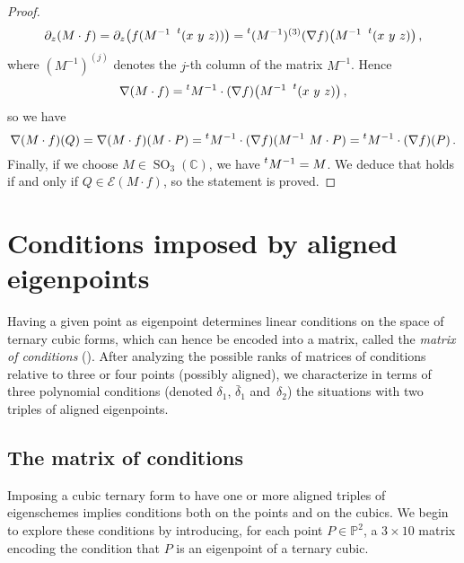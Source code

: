 \documentclass[a4paper, 11pt, reqno]{amsart}
\theoremstyle{plain}
\theoremstyle{definition}
\newcommand{\C}{\mathbb{C}}
\newcommand{\p}{\mathbb{P}}
\newcommand{\SO}{\operatorname{SO}}
\newcommand{\Eig}[1]{\mathcal{E}\!\left( {#1} \right)}
\begin{document}
\begin{proof}
\begin{gather*}
  \partial_z (M\cdot f) = \partial_z \bigl( f(M^{-1} \ \prescript{t} {} (x \ y \ z)) \bigr) = \prescript{t} {}(M^{-1})^{(3)}(\nabla f) \bigl( M^{-1}\ \prescript{t} {} (x \ y \ z) \bigr) \,,
\end{gather*}
%
where $(M^{-1})^{(j)}$ denotes the $j$-th column of the matrix $M^{-1}$. Hence
%
\[
  \nabla (M \cdot f) = \prescript{t} {} M^{-1} \cdot (\nabla f) \bigl(M^{-1}\ \prescript{t} {} (x \ y \ z)\bigr) \,,
\]
%
so we have
%
\[
  \nabla (M \cdot f)(Q)=\nabla (M \cdot f)(M \cdot P)=
  \prescript{t} {} M^{-1} \cdot (\nabla f) (M^{-1}\ M \cdot P)=\prescript{t} {} M^{-1} \cdot (\nabla f)(P) \,.
\]
%
Finally, if we choose $M \in \SO_3(\C)$, we have
$\prescript{t} {} M^{-1}=M$. We deduce that
 holds if and only if $Q \in \Eig{M\cdot f}$, so the statement is proved.
\end{proof}


\section{Conditions imposed by aligned eigenpoints}
\label{conditions}

Having a given point as eigenpoint determines linear conditions on the space of ternary cubic forms, 
which can hence be encoded into a matrix, called the \emph{matrix of conditions} (). 
After analyzing the possible ranks of matrices of conditions relative to three or four points (possibly aligned), we characterize in terms of three polynomial conditions (denoted $\delta_1$, $\bar{\delta}_1$ and~$\delta_2$) the situations with two triples of aligned eigenpoints.

\subsection{The matrix of conditions}

Imposing a cubic ternary form to have one or more aligned triples of eigenschemes implies conditions both on the points and on the cubics.
We begin to explore these conditions by introducing, for each point
$P \in \p^2$,
a $3 \times 10$ matrix encoding the condition that $P$ is an eigenpoint of a ternary cubic.
\end{document}
